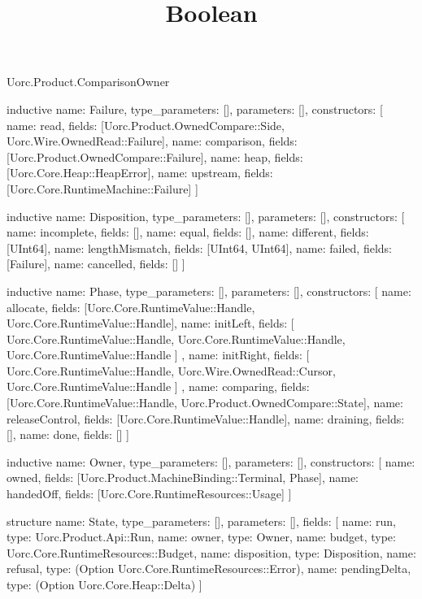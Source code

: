 \begin{lexlean}{Uorc.Product.ComparisonOwner}
\title{Boolean}
\begin{semanticmodule}
inductive{
  name: Failure,
  type_parameters: [],
  parameters: [],
  constructors: [
    {name: read, fields: [Uorc.Product.OwnedCompare::Side, Uorc.Wire.OwnedRead::Failure]},
    {name: comparison, fields: [Uorc.Product.OwnedCompare::Failure]},
    {name: heap, fields: [Uorc.Core.Heap::HeapError]},
    {name: upstream, fields: [Uorc.Core.RuntimeMachine::Failure]}
  ]
}

inductive{
  name: Disposition,
  type_parameters: [],
  parameters: [],
  constructors: [
    {name: incomplete, fields: []},
    {name: equal, fields: []},
    {name: different, fields: [UInt64]},
    {name: lengthMismatch, fields: [UInt64, UInt64]},
    {name: failed, fields: [Failure]},
    {name: cancelled, fields: []}
  ]
}

inductive{
  name: Phase,
  type_parameters: [],
  parameters: [],
  constructors: [
    {name: allocate, fields: [Uorc.Core.RuntimeValue::Handle, Uorc.Core.RuntimeValue::Handle]},
    {
      name: initLeft,
      fields: [
        Uorc.Core.RuntimeValue::Handle,
        Uorc.Core.RuntimeValue::Handle,
        Uorc.Core.RuntimeValue::Handle
      ]
    },
    {
      name: initRight,
      fields: [
        Uorc.Core.RuntimeValue::Handle,
        Uorc.Wire.OwnedRead::Cursor,
        Uorc.Core.RuntimeValue::Handle
      ]
    },
    {name: comparing, fields: [Uorc.Core.RuntimeValue::Handle, Uorc.Product.OwnedCompare::State]},
    {name: releaseControl, fields: [Uorc.Core.RuntimeValue::Handle]},
    {name: draining, fields: []},
    {name: done, fields: []}
  ]
}

inductive{
  name: Owner,
  type_parameters: [],
  parameters: [],
  constructors: [
    {name: owned, fields: [Uorc.Product.MachineBinding::Terminal, Phase]},
    {name: handedOff, fields: [Uorc.Core.RuntimeResources::Usage]}
  ]
}

structure{
  name: State,
  type_parameters: [],
  parameters: [],
  fields: [
    {name: run, type: Uorc.Product.Api::Run},
    {name: owner, type: Owner},
    {name: budget, type: Uorc.Core.RuntimeResources::Budget},
    {name: disposition, type: Disposition},
    {name: refusal, type: (Option Uorc.Core.RuntimeResources::Error)},
    {name: pendingDelta, type: (Option Uorc.Core.Heap::Delta)}
  ]
}


\end{semanticmodule}
\end{lexlean}
